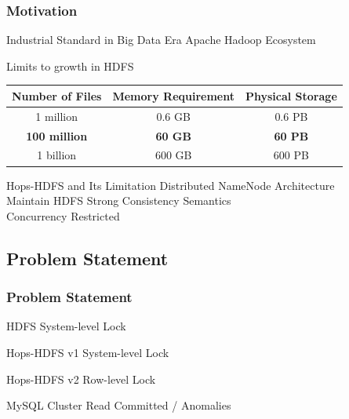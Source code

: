 \documentclass{beamer}
\begin{document}
\begin{frame}
\frametitle{Motivation}
\begin{block}{Industrial Standard in Big Data Era}
	Apache Hadoop Ecosystem
\end{block}

\begin{block}{Limits to growth in HDFS}
	\begin{table}[ht]
		\centering
		\begin{tabular}{|c|c|c|}
			\hline
			\textbf{Number of Files} & \textbf{Memory Requirement} & \textbf{Physical Storage} \\ \hline
			1 million       & 0.6 GB             & 0.6 PB           \\ \hline
			{\color{red}\textbf{100 million}}     & {\color{red}\textbf{60 GB}}              & {\color{red}\textbf{60 PB}}            \\ \hline
			1 billion       & 600 GB             & 600 PB           \\ \hline
		\end{tabular}
	\end{table}
\end{block}

\begin{block}{Hops-HDFS and Its Limitation}
	Distributed NameNode Architecture \\ Maintain HDFS Strong Consistency Semantics \\ Concurrency Restricted
\end{block}
\end{frame}

\subsection{Problem Statement}
\begin{frame}
\frametitle{Problem Statement}
\begin{block}{HDFS}
	System-level Lock
\end{block}
\begin{block}{Hops-HDFS v1}
	System-level Lock
\end{block}
\begin{block}{Hops-HDFS v2}
	Row-level Lock
\end{block}
\begin{block}{MySQL Cluster}
	Read Committed / Anomalies
\end{block}
\end{frame}
\end{document}
